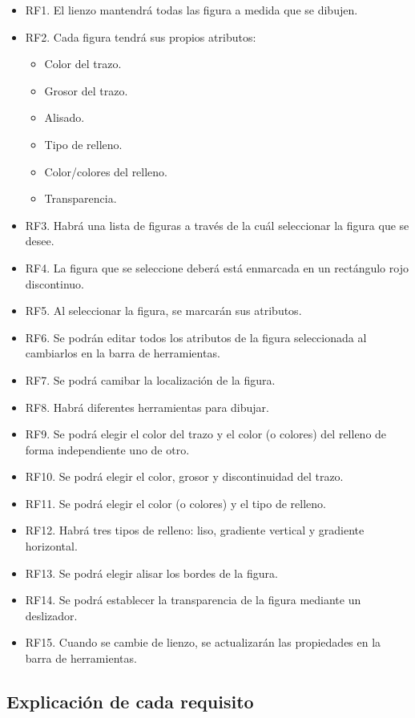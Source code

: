 \documentclass[11pt,a4paper]{article}
\begin{document}
\begin{itemize}
	\item RF1. El lienzo mantendrá todas las figura a medida que se dibujen.
	\item RF2. Cada figura tendrá sus propios atributos:
		\begin{itemize}
			\item Color del trazo.
			\item Grosor del trazo.
			\item Alisado.
			\item Tipo de relleno.
			\item Color/colores del relleno.
			\item Transparencia.
		\end{itemize}
	\item RF3. Habrá una lista de figuras a través de la cuál seleccionar la figura que se desee.
	\item RF4. La figura que se seleccione deberá está enmarcada en un rectángulo rojo discontinuo.
	\item RF5. Al seleccionar la figura, se marcarán sus atributos.
	\item RF6. Se podrán editar todos los atributos de la figura seleccionada al cambiarlos en la barra de herramientas.
	\item RF7. Se podrá camibar la localización de la figura.
	\item RF8. Habrá diferentes herramientas para dibujar.
	\item RF9. Se podrá elegir el color del trazo y el color (o colores) del relleno de forma independiente uno de otro.
	\item RF10. Se podrá elegir el color, grosor y discontinuidad del trazo.
	\item RF11. Se podrá elegir el color (o colores) y el tipo de relleno.
	\item RF12. Habrá tres tipos de relleno: liso, gradiente vertical y gradiente horizontal.
	\item RF13. Se podrá elegir alisar los bordes de la figura.
	\item RF14. Se podrá establecer la transparencia de la figura mediante un deslizador.
	\item RF15. Cuando se cambie de lienzo, se actualizarán las propiedades en la barra de herramientas.
\end{itemize}

\subsection{Explicación de cada requisito}
\end{document}
